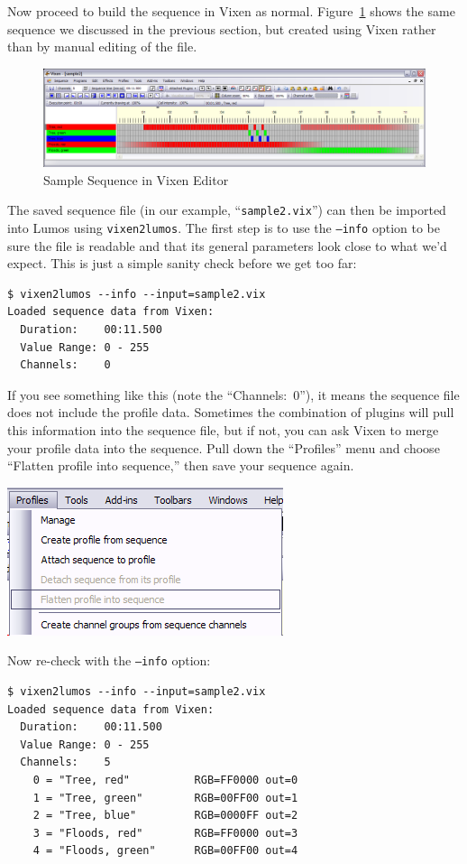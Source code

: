 \documentclass{article}
\begin{document}
Now proceed to build the sequence in Vixen as normal.  Figure~\ref{vix:seq}
shows the same sequence we discussed in the previous section, but created
using Vixen rather than by manual editing of the file.

\begin{figure}[p]
\includegraphics{vix-sequence}
\caption{Sample Sequence in Vixen Editor}
\label{vix:seq}
\end{figure}

The saved sequence file (in our example, ``{\tt sample2.vix}'') can then be
imported into Lumos using {\tt vixen2lumos}.  The first step is to use the
{\tt --info} option to be sure the file is readable and that its general
parameters look close to what we'd expect.  This is just a simple sanity check
before we get too far:
\begin{verbatim}
$ vixen2lumos --info --input=sample2.vix
Loaded sequence data from Vixen:
  Duration:    00:11.500
  Value Range: 0 - 255
  Channels:    0
\end{verbatim}

If you see something like this (note the ``Channels:~0''), it means the
sequence file does not include the profile data.  Sometimes the combination of
plugins will pull this information into the sequence file, but if not, you can
ask Vixen to merge your profile data into the sequence.  Pull down the
``Profiles'' menu and choose ``Flatten profile into sequence,'' then save your
sequence again.

\noindent\includegraphics{vix-merge}

Now re-check with the {\tt --info} option:
\begin{verbatim}
$ vixen2lumos --info --input=sample2.vix
Loaded sequence data from Vixen:
  Duration:    00:11.500
  Value Range: 0 - 255
  Channels:    5
    0 = "Tree, red"          RGB=FF0000 out=0
    1 = "Tree, green"        RGB=00FF00 out=1
    2 = "Tree, blue"         RGB=0000FF out=2
    3 = "Floods, red"        RGB=FF0000 out=3
    4 = "Floods, green"      RGB=00FF00 out=4
\end{verbatim}
\end{document}
